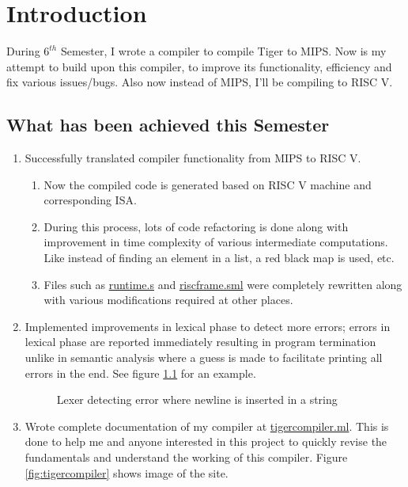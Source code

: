 \chapter{Introduction}
\hspace{3mm}

During $6^{th}$ Semester, I wrote a compiler to compile Tiger to MIPS. Now is my attempt to build upon this compiler, to improve its functionality, efficiency and fix various issues/bugs. Also now instead of MIPS, I'll be compiling to RISC V.

\section{What has been achieved this Semester}

\begin{enumerate}
  \item Successfully translated compiler functionality from MIPS to RISC V.
    \begin{enumerate} 
      \item Now the compiled code is generated based on RISC V machine and corresponding ISA.
      \item During this process, lots of code refactoring is done along with improvement in time complexity of various intermediate computations. Like instead of finding an element in a list, a red black map is used, etc.  
      \item Files such as \href{https://github.com/sourabh2311/btp/blob/master/Compiler/runtime.s}{runtime.s} and \href{https://github.com/sourabh2311/btp/blob/master/Compiler/riscframe.sml}{riscframe.sml} were completely rewritten along with various modifications required at other places.
    \end{enumerate}
  \item Implemented improvements in lexical phase to detect more errors; errors in lexical phase are reported immediately resulting in program termination unlike in semantic analysis where a guess is made to facilitate printing all errors in the end. See figure \ref{fig:lexError} for an example.
    \begin{figure}
    \centering
    \caption{Lexer detecting error where newline is inserted in a string}
    \label{fig:lexError}
    \end{figure}
  \item Wrote complete documentation of my compiler at \href{https://tigercompiler.ml}{tigercompiler.ml}. This is done to help me and anyone interested in this project to quickly revise the fundamentals and understand the working of this compiler. Figure \ref{fig:tigercompiler} shows image of the site.

\end{enumerate}
